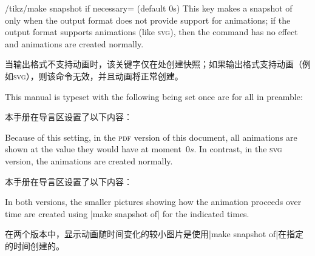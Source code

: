 \begin{key}{/tikz/make snapshot if necessary= (default 0s)}
    This key makes a snapshot of  only when the output format does
    not provide support for animations; if the output format supports
    animations (like \textsc{svg}), then the command has no effect and
    animations are created normally.

    当输出格式不支持动画时，该关键字仅在处创建快照；如果输出格式支持动画（例如\textsc{svg}），则该命令无效，并且动画将正常创建。

    This manual is typeset with the following being set once are for all in
    preamble:
    
    本手册在导言区设置了以下内容：


\begin{codeexample}
\tikzset{make snapshot if necessary}
\end{codeexample}

    Because of this setting, in the \textsc{pdf} version of this document, all
    animations are shown at the value they would have at moment~$0s$. In
    contrast, in the \textsc{svg} version, the animations are created normally.

    本手册在导言区设置了以下内容：

    In both versions, the smaller pictures showing how the animation proceeds
    over time are created using |make snapshot of| for the indicated times.

    在两个版本中，显示动画随时间变化的较小图片是使用|make snapshot of|在指定的时间创建的。

\end{key}


 
